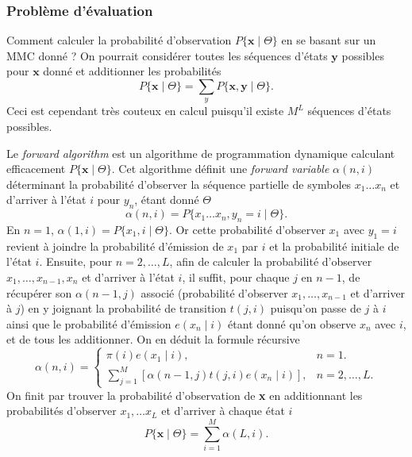 \documentclass[a4paper, 11pt]{article}
\newcommand{\pinit}{\pi (i)}
\begin{document}
\subsubsection{Problème d'évaluation}
Comment calculer la probabilité d'observation $P\{\textbf{x}\mid \Theta\}$ en se basant sur un MMC donné ? On pourrait considérer toutes les séquences d'états $\textbf{y}$ possibles pour $\textbf{x}$ donné et additionner les probabilités 
\begin{equation}
P\{\textbf{x}\mid \Theta\} = \sum_{y}P\{\textbf{x},\textbf{y}\mid \Theta\}.
\end{equation}
Ceci est cependant très couteux en calcul puisqu'il existe $M^L$ séquences d'états possibles.
\\
\par
Le \textit{forward algorithm} est un algorithme de programmation dynamique calculant efficacement $P\{\textbf{x}\mid \Theta\}$. Cet algorithme définit une \textit{forward variable} $\alpha (n,i) $ déterminant la probabilité d'observer la séquence partielle de symboles $x_1\dotsc x_n$ et d'arriver à l'état $i$ pour $y_n$, étant donné $\Theta$
\begin{equation}
\alpha (n,i) = P\{x_1\dotsc x_n,y_n=i\mid \Theta\}.
\end{equation}
En $n=1$, $\alpha (1,i) = P\{x_1,i\mid \Theta\}$. Or cette probabilité d'observer $x_1$ avec $y_1 =i$ revient à joindre la probabilité d'émission de $x_1$ par $i$ et la probabilité initiale de l'état $i$. Ensuite, pour $n=2,\dotsc ,L$, afin de calculer la probabilité d'observer $x_1,\dotsc ,x_{n-1},x_{n}$ et d'arriver à l'état $i$, il suffit, pour chaque $j$ en $n-1$, de récupérer son $\alpha (n-1,j)$ associé (probabilité d'observer $x_1,\dotsc ,x_{n-1}$ et d'arriver à $j$) en y joignant la probabilité de transition $t(j,i)$ puisqu'on passe de $j$ à $i$ ainsi que le probabilité d'émission $e(x_{n}\mid i)$ étant donné qu'on observe $x_{n}$ avec $i$, et de tous les additionner. On en déduit la formule récursive
\begin{equation}
\alpha (n,i) = \begin{cases}
	\pinit e(x_1\mid i), & n=1.\\ 
	\sum_{j=1}^{M}[\alpha(n-1,j)t(j,i)e(x_{n}\mid i)], & n=2,\dotsc ,L.
\end{cases}
\end{equation}
On finit par trouver la probabilité d'observation de \textbf{x} en additionnant les probabilités d'observer $x_1,\dotsc x_L$ et d'arriver à chaque état $i$ 
\begin{equation}
P\{\textbf{x}\mid \Theta\} = \sum_{i=1}^{M}\alpha (L,i).
\end{equation}
\end{document}
